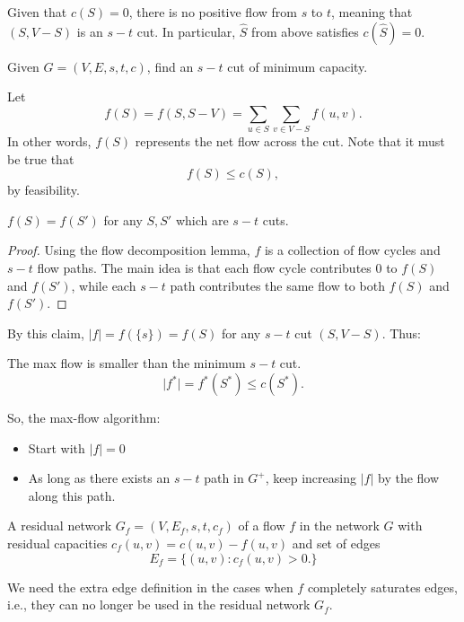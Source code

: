 Given that $c(S) = 0$, there is no positive flow from $s$ to $t$, meaning that $(S, V-S)$ is an $s-t$ cut. In particular, $\hat{S}$ from above satisfies $c(\hat{S}) = 0$.

\begin{definition}

Given $G=(V,E,s,t,c)$, find an $s-t$ cut of minimum capacity. 
\end{definition}

Let
\[f(S) = f(S, S-V) = \sum_{u\in S}\sum_{v\in V-S}f(u,v).\]
In other words, $f(S)$ represents the net flow across the cut. Note that it must be true that 
\[f(S)\leq c(S),\]
by feasibility. 

\begin{theorem}
\claimlabel

$f(S) = f(S')$ for any $S,S'$ which are $s-t$ cuts. 
\end{theorem}

\begin{proof}
Using the flow decomposition lemma, $f$ is a collection of flow cycles and $s-t$ flow paths. The main idea is that each flow cycle contributes $0$ to $f(S)$ and $f(S')$, while each $s-t$ path contributes the same flow to both $f(S)$ and $f(S')$. 
\end{proof}

By this claim, $\vert f\vert = f(\{s\}) = f(S)$ for any $s-t$ cut $(S, V-S)$. Thus:
\begin{theorem}

The max flow is smaller than the minimum $s-t$ cut. 
\[\vert f^*\vert = f^*(S^*) \leq c(S^*).\]
\end{theorem}

So, the max-flow algorithm: 
\begin{itemize}
    \item Start with $\vert f\vert = 0$
    \item As long as there exists an $s-t$ path in $G^+$, keep increasing $\vert f\vert$ by the flow along this path. 
\end{itemize}

\begin{definition}

A \ac{residual network} $G_f = (V, E_f, s, t, c_f)$ of a flow $f$ in the network $G$ with residual capacities $c_f(u,v) = c(u,v) - f(u,v)$ and set of edges 
\[E_f = \{(u,v) : c_f(u,v) > 0.\}\]
\end{definition}
We need the extra edge definition in the cases when $f$ completely saturates edges, i.e., they can no longer be used in the residual network $G_f$.


